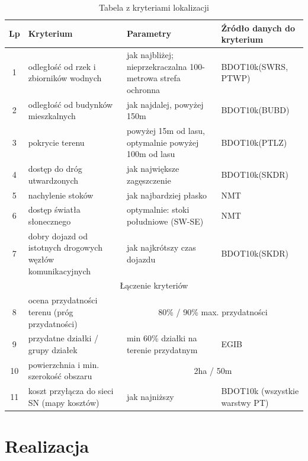 \documentclass{article}
\begin{document}
\begin{table}[h!]
    \centering
    \renewcommand{\arraystretch}{1.4}
    \begin{tabular}{|c|p{4cm}|p{5cm}|p{3.5cm}|}
    \hline
    \textbf{Lp} & \textbf{Kryterium} & \textbf{Parametry} & \textbf{Źródło danych do kryterium} \\ \hline
    1 & odległość od rzek i zbiorników wodnych & jak najbliżej; nieprzekraczalna 100-metrowa strefa ochronna & BDOT10k(SWRS, PTWP)\\ \hline
    2 & odległość od budynków mieszkalnych & jak najdalej, powyżej 150m & BDOT10k(BUBD)\\ \hline
    3 & pokrycie terenu & powyżej 15m od lasu, optymalnie powyżej 100m od lasu & BDOT10k(PTLZ)\\ \hline
    4 & dostęp do dróg utwardzonych & jak największe zagęszczenie & BDOT10k(SKDR)\\ \hline
    5 & nachylenie stoków & jak najbardziej płasko & NMT\\ \hline
    6 & dostęp światła słonecznego & optymalnie: stoki południowe (SW-SE) & NMT\\ \hline
    7 & dobry dojazd od istotnych drogowych węzłów komunikacyjnych & jak najkrótszy czas dojazdu & BDOT10k(SKDR)\\ \hline
    \multicolumn{4}{|c|}{Łączenie kryteriów} \\ \hline
    8 & ocena przydatności terenu (próg przydatności) & \multicolumn{2}{|c|}{80\% / 90\% max. przydatności}\\ \hline
    9 & przydatne działki / grupy działek & min 60\% działki na terenie przydatnym & EGIB \\ \hline
    10 & powierzchnia i min. szerokość obszaru & \multicolumn{2}{|c|}{2ha / 50m}\\ \hline
    11 & koszt przyłącza do sieci SN (mapy kosztów) & jak najniższy & BDOT10k (wszystkie warstwy PT)\\ \hline
    \end{tabular}
    \caption{Tabela z kryteriami lokalizacji}
    \label{tab:kryteria}
    \end{table}
\newpage

\section{Realizacja}
\end{document}
